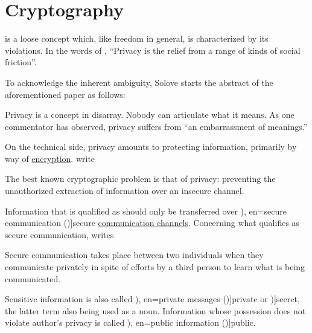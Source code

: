\section{Cryptography}\label{sec:cryptography}

\begin{concept}\label{con:privacy}
   is a loose concept which, like freedom in general, is characterized by its violations. In the words of \textcite[484]{Solove2006Privacy}, \enquote{Privacy is the relief from a range of kinds of social friction}.

  To acknowledge the inherent ambiguity, Solove starts the abstract of the aforementioned paper as follows:
  \begin{displayquote}
    Privacy is a concept in disarray. Nobody can articulate what it means. As one commentator has observed, privacy suffers from \enquote{an embarrassment of meanings.}
  \end{displayquote}

  On the technical side, privacy amounts to protecting information, primarily by way of \hyperref[con:cryptography]{encryption}. \textcite[644]{DiffieHellman1976NewDirectionsInCryptography} write
  \begin{displayquote}
    The best known cryptographic problem is that of privacy: preventing the unauthorized extraction of information over an insecure channel.
  \end{displayquote}

  Information that is qualified as  should only be transferred over \term[ru=защищённый канал (\cite[52]{АлферовИПр2002ОсновыКриптографии}), en=secure communication (\cite[295]{Merkle1978SecureCommunications})]{secure} \hyperref[con:communication_channel]{communication channels}. Concerning what qualifies as secure communication, \textcite{Merkle1978SecureCommunications} writes
  \begin{displayquote}
    Secure communication takes place between two individuals when they communicate privately in spite of efforts by a third person to learn what is being communicated.
  \end{displayquote}

  Sensitive information is also called \term[ru=частная информация (\cite[57]{АлферовИПр2002ОсновыКриптографии}), en=private messages (\cite[120]{RivestShamirAdleman1978RSA})]{private} or \term[en=secret message (\cite[335]{Strogatz1994NonlinearDynamics})]{secret}, the latter term also being used as a noun. Information whose possession does not violate author's privacy is called \term[ru=открытая информация (\cite[56]{АлферовИПр2002ОсновыКриптографии}), en=public information (\cite[650]{DiffieHellman1976NewDirectionsInCryptography})]{public}.
\end{concept}

